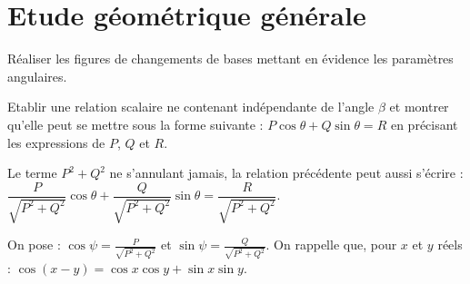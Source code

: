 \section{Etude géométrique générale \label{2026_ats_s3_1}}
\begin{question}
Réaliser les figures de changements de bases mettant en évidence les paramètres angulaires.
\end{question}
\ifprof
\begin{corrige}
\end{corrige}
\else
\fi



\begin{question}
Etablir une relation scalaire ne contenant indépendante de l'angle $\beta$ et montrer qu'elle peut se mettre sous la forme suivante : 
$P  \cos \theta+Q  \sin \theta=R$ en précisant les expressions de $P$, $Q$ et $R$.
\end{question}
\ifprof
\begin{corrige}
\end{corrige}
\else
\fi
%

Le terme $P^{2}+Q^{2}$ ne s'annulant jamais, la relation précédente peut aussi s'écrire :
$
\dfrac{P}{\sqrt{P^{2}+Q^{2}}}  \cos \theta+\dfrac{Q}{\sqrt{P^{2}+Q^{2}}} \sin \theta=\dfrac{R}{\sqrt{P^{2}+Q^{2}}}
$.

On pose : $\cos \psi=\frac{P}{\sqrt{P^{2}+Q^{2}}}$ et $\sin \psi=\frac{Q}{\sqrt{P^{2}+Q^{2}}}$. On rappelle que, pour $x$ et $y$ réels : $\cos \left(x-y\right)=\cos x  \cos y+\sin x \sin y$.

